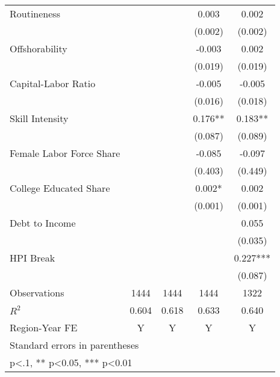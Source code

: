 \begin{table}[htbp]
\begin{tabular}{l*{4}{c}}
\addlinespace
Routineness         &            &            &    0.003   &    0.002   \\
                    &            &            &  (0.002)   &  (0.002)   \\
\addlinespace
Offshorability      &            &            &   -0.003   &    0.002   \\
                    &            &            &  (0.019)   &  (0.019)   \\
\addlinespace
Capital-Labor Ratio &            &            &   -0.005   &   -0.005   \\
                    &            &            &  (0.016)   &  (0.018)   \\
\addlinespace
Skill Intensity     &            &            &    0.176** &    0.183** \\
                    &            &            &  (0.087)   &  (0.089)   \\
\addlinespace
Female Labor Force Share&            &            &   -0.085   &   -0.097   \\
                    &            &            &  (0.403)   &  (0.449)   \\
\addlinespace
College Educated Share&            &            &    0.002*  &    0.002   \\
                    &            &            &  (0.001)   &  (0.001)   \\
\addlinespace
Debt to Income      &            &            &            &    0.055   \\
                    &            &            &            &  (0.035)   \\
\addlinespace
HPI Break           &            &            &            &    0.227***\\
                    &            &            &            &  (0.087)   \\
\midrule
Observations        &     1444   &     1444   &     1444   &     1322   \\
\(R^{2}\)           &    0.604   &    0.618   &    0.633   &    0.640   \\
Region-Year FE      &        Y   &        Y   &        Y   &        Y   \\
\bottomrule
\multicolumn{5}{l}{\footnotesize Standard errors in parentheses}\\
\multicolumn{5}{l}{\footnotesize * p<.1, ** p<0.05, *** p<0.01}\\
\end{tabular}
\end{table}
